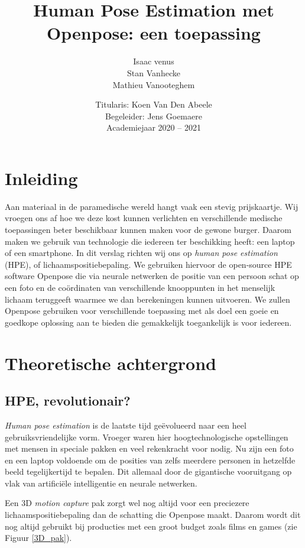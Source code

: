 \documentclass[a4paper,twoside,kulak]{kulakreport}
\title{Human Pose Estimation met Openpose: een toepassing}
\subtitle{}
\author{Isaac venus\\Stan Vanhecke\\Mathieu Vanooteghem}
\institute{KU Leuven Kulak, Wetenschap \& Technologie}
\date{Titularis: Koen Van Den Abeele\\Begeleider: Jens Goemaere\\Academiejaar 2020 -- 2021}
\begin{document}

\titlepage

\tableofcontents

\chapter*{Inleiding}
Aan materiaal in de paramedische wereld hangt vaak een stevig prijskaartje. Wij vroegen ons af hoe we deze kost kunnen verlichten en verschillende medische toepassingen beter beschikbaar kunnen maken voor de gewone burger. Daarom maken we gebruik van technologie die iedereen ter beschikking heeft: een laptop of een smartphone.
In dit verslag richten wij ons op \emph{human pose estimation} (HPE), of lichaamspositiebepaling. We gebruiken hiervoor de open-source HPE software Openpose die via neurale netwerken de positie van een persoon schat op een foto en de coördinaten van verschillende knooppunten in het menselijk lichaam teruggeeft waarmee we dan berekeningen kunnen uitvoeren. We zullen Openpose gebruiken voor verschillende toepassing met als doel een goeie en goedkope oplossing aan te bieden die gemakkelijk toegankelijk is voor iedereen.

\chapter{Theoretische achtergrond}
\section{HPE, revolutionair?}
\emph{Human pose estimation} is de laatste tijd geëvolueerd naar een heel gebruiksvriendelijke vorm. Vroeger waren hier hoogtechnologische opstellingen met mensen in speciale pakken en veel rekenkracht voor nodig. Nu zijn een foto en een laptop voldoende om de posities van zelfs meerdere personen in hetzelfde beeld tegelijkertijd te bepalen. Dit allemaal door de gigantische vooruitgang op vlak van artificiële intelligentie en neurale netwerken.

Een 3D \emph{motion capture} pak zorgt wel nog altijd voor een preciezere lichaamspositiebepaling dan de schatting die Openpose maakt. Daarom wordt dit nog altijd gebruikt bij producties met een groot budget zoals films en games (zie Figuur \ref{3D_pak}).
\end{document}
